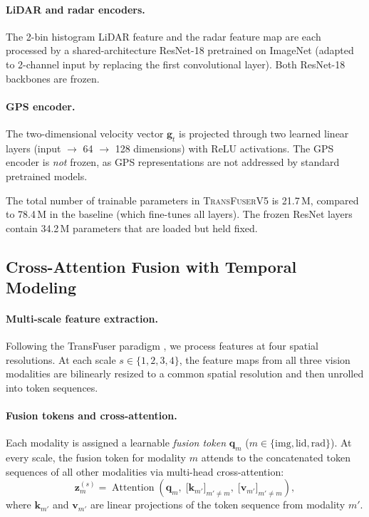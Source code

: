 \documentclass[journal,10pt,twoside]{IEEEtran}
\newcommand{\ours}{\textsc{TransFuserV5}}
\begin{document}
\paragraph{LiDAR and radar encoders.}
The 2-bin histogram LiDAR feature and the radar feature map are each
processed by a shared-architecture ResNet-18 \cite{he2016deep} pretrained
on ImageNet (adapted to 2-channel input by replacing the first convolutional
layer). Both ResNet-18 backbones are frozen.

\paragraph{GPS encoder.}
The two-dimensional velocity vector $\mathbf{g}_t$ is projected through two
learned linear layers (input $\to$ 64 $\to$ 128 dimensions) with ReLU
activations. The GPS encoder is \emph{not} frozen, as GPS representations are
not addressed by standard pretrained models.

The total number of trainable parameters in \ours{} is 21.7\,M, compared to
78.4\,M in the baseline (which fine-tunes all layers). The frozen ResNet
layers contain 34.2\,M parameters that are loaded but held fixed.

\subsection{Cross-Attention Fusion with Temporal Modeling}

\paragraph{Multi-scale feature extraction.}
Following the TransFuser paradigm \cite{prakash2021transfuser}, we process
features at four spatial resolutions. At each scale $s \in \{1,2,3,4\}$,
the feature maps from all three vision modalities are bilinearly resized to
a common spatial resolution and then unrolled into token sequences.

\paragraph{Fusion tokens and cross-attention.}
Each modality is assigned a learnable \emph{fusion token} $\mathbf{q}_m$
($m \in \{\text{img}, \text{lid}, \text{rad}\}$). At every scale, the fusion
token for modality $m$ attends to the concatenated token sequences of all other
modalities via multi-head cross-attention:
\begin{equation}
  \mathbf{z}_m^{(s)} = \operatorname{Attention}\!\left(
    \mathbf{q}_m,\;
    \bigl[\mathbf{k}_{m'}\bigr]_{m' \neq m},\;
    \bigl[\mathbf{v}_{m'}\bigr]_{m' \neq m}
  \right),
  \label{eq:crossattn}
\end{equation}
where $\mathbf{k}_{m'}$ and $\mathbf{v}_{m'}$ are linear projections of the
token sequence from modality $m'$.
\end{document}
